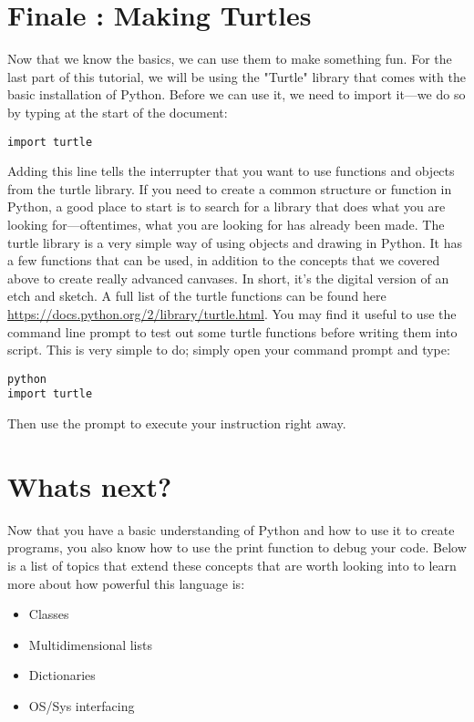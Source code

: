 \documentclass{article}
\begin{document}
\section{Finale : Making    Turtles}
Now that we know the basics, we can use them to make something fun. For the last part of this tutorial, we will be using the "Turtle" library that comes with the basic installation of Python. Before we can use it, we need to import it—we do so by typing at the start of the document:
\begin{lstlisting}
import turtle
\end{lstlisting}
Adding this line tells the interrupter that you want to use functions and objects from the turtle library. If you need to create a common structure or function in Python, a good place to start is to search for a library that does what you are looking for—oftentimes, what you are looking for has already been made.
The turtle library is a very simple way of using objects and drawing in Python. It has a few functions that can be used, in addition to the concepts that we covered above to create really advanced canvases. In short, it's the digital version of an etch and sketch. A full list of the turtle functions can be found here \url{https://docs.python.org/2/library/turtle.html}. You may find it useful to use the command line prompt to test out some turtle functions before writing them into script. This is very simple to do; simply open your command prompt and type: 
\begin{lstlisting}
python
import turtle 
\end{lstlisting}
Then use the prompt to execute your instruction right away.
\section{Whats next?}
Now that you have a basic understanding of Python and how to use it to create programs, you also know how to use the print function to debug your code. Below is a list of topics that extend these concepts that are worth looking into to learn more about how powerful this language is: 
\begin{itemize}
    \item Classes 
    \item Multidimensional lists 
    \item Dictionaries  
    \item OS/Sys interfacing
\end{itemize}
\end{document}
